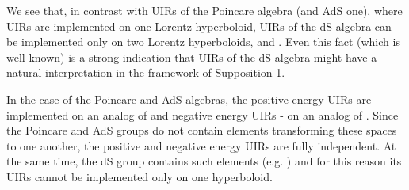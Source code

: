 \documentclass[a4paper,12pt]{article}%
\begin{document}
We see that, in contrast with UIRs of the Poincare 
algebra (and AdS one), where UIRs are implemented on
one Lorentz hyperboloid, UIRs of the dS algebra can be
implemented only on two Lorentz hyperboloids, \coordHE{}
and \coordHE{}. Even this
fact (which is well known) is a strong indication 
that UIRs of the dS algebra might
have a natural interpretation in the framework of
Supposition 1.

In the case of the Poincare and AdS algebras, the positive
energy UIRs are implemented on an analog of \coordHE{} and 
negative energy UIRs - on an analog of \coordHE{}. Since the 
Poincare and AdS groups
do not contain elements transforming these spaces
to one another, the positive and negative energy UIRs 
are fully independent. At the same time, the dS 
group contains 
such elements (e.g. \coordHE{} \cite{Men,Dobrev,Mielke}) and for 
this reason its UIRs cannot be implemented only on 
one hyperboloid. 
\end{document}
